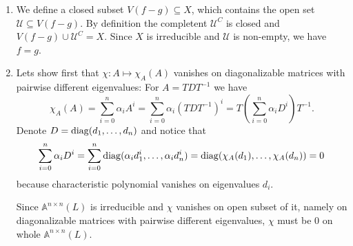 \begin{exercise}{3}
    \begin{enumerate}
        \item{} We define a closed subset $V(f - g) \subseteq X$, which contains
            the open set $\mathcal{U} \subseteq V(f - g)$. By definition the
            completent $\mathcal{U}^C$ is closed and $V(f - g) \cup
            \mathcal{U}^C = X$. Since $X$ is irreducible and $\mathcal{U}$ is
            non-empty, we have $f = g$.

        \item{} Lets show first that $\chi \colon A \mapsto \chi_A(A)$ vanishes
            on diagonalizable matrices with pairwise different eigenvalues: For
            $A = T D T^{-1}$ we have
            \begin{equation*}
                \chi_A(A) = \sum^n_{i = 0} \alpha_i A^i = \sum^n_{i = 0}
                \alpha_i (T D T^{-1})^i = T \left( \sum^n_{i = 0} \alpha_i  D^i
                \right) T^{-1}.
            \end{equation*}
            Denote $D = \operatorname{diag}(d_1, \dots, d_n)$ and notice that
            \begin{equation*}
                \sum^n_{i = 0} \alpha_i  D^i = 
                \sum^n_{i = 0} \operatorname{diag}(\alpha_i d^i_1, \dots, \alpha_i d^i_n) = 
                \operatorname{diag}(\chi_A(d_1), \dots, \chi_A(d_n)) = 0
            \end{equation*}
            because characteristic polynomial vanishes on eigenvalues $d_i$.

            Since $\mathbb{A}^{n \times n}(L)$ is irreducible
            and $\chi$ vanishes on open subset of it, namely on diagonalizable
            matrices with pairwise different eigenvalues, $\chi$ must be $0$ on
            whole $\mathbb{A}^{n \times n}(L)$.
    \end{enumerate}
\end{exercise}

